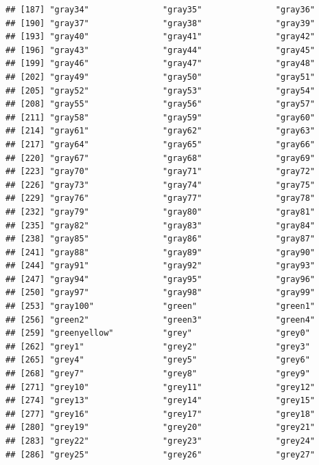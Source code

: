 \documentclass[]{book}
\begin{document}
\begin{verbatim}
## [187] "gray34"               "gray35"               "gray36"              
## [190] "gray37"               "gray38"               "gray39"              
## [193] "gray40"               "gray41"               "gray42"              
## [196] "gray43"               "gray44"               "gray45"              
## [199] "gray46"               "gray47"               "gray48"              
## [202] "gray49"               "gray50"               "gray51"              
## [205] "gray52"               "gray53"               "gray54"              
## [208] "gray55"               "gray56"               "gray57"              
## [211] "gray58"               "gray59"               "gray60"              
## [214] "gray61"               "gray62"               "gray63"              
## [217] "gray64"               "gray65"               "gray66"              
## [220] "gray67"               "gray68"               "gray69"              
## [223] "gray70"               "gray71"               "gray72"              
## [226] "gray73"               "gray74"               "gray75"              
## [229] "gray76"               "gray77"               "gray78"              
## [232] "gray79"               "gray80"               "gray81"              
## [235] "gray82"               "gray83"               "gray84"              
## [238] "gray85"               "gray86"               "gray87"              
## [241] "gray88"               "gray89"               "gray90"              
## [244] "gray91"               "gray92"               "gray93"              
## [247] "gray94"               "gray95"               "gray96"              
## [250] "gray97"               "gray98"               "gray99"              
## [253] "gray100"              "green"                "green1"              
## [256] "green2"               "green3"               "green4"              
## [259] "greenyellow"          "grey"                 "grey0"               
## [262] "grey1"                "grey2"                "grey3"               
## [265] "grey4"                "grey5"                "grey6"               
## [268] "grey7"                "grey8"                "grey9"               
## [271] "grey10"               "grey11"               "grey12"              
## [274] "grey13"               "grey14"               "grey15"              
## [277] "grey16"               "grey17"               "grey18"              
## [280] "grey19"               "grey20"               "grey21"              
## [283] "grey22"               "grey23"               "grey24"              
## [286] "grey25"               "grey26"               "grey27"              

\end{verbatim}
\end{document}
